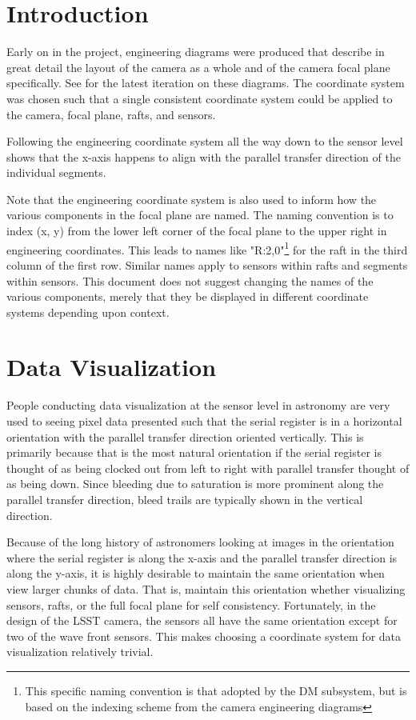 \section{Introduction} \label{sec:intro}
Early on in the project, engineering diagrams were produced that describe in great detail the layout of the camera as a whole and of the camera focal plane specifically. See  for the latest iteration on these diagrams. The coordinate system was chosen such that a single consistent coordinate system could be applied to the camera, focal plane, rafts, and sensors.

Following the engineering coordinate system all the way down to the sensor level shows that the x-axis happens to align with the parallel transfer direction of the individual segments.

Note that the engineering coordinate system is also used to inform how the various components in the focal plane are named. The naming convention is to index (x, y) from the lower left corner of the focal plane to the upper right in engineering coordinates. This leads to names like "R:2,0"\footnote{This specific naming convention is that adopted by the DM subsystem, but is based on the indexing scheme from the camera engineering diagrams} for the raft in the third column of the first row. Similar names apply to sensors within rafts and segments within sensors. This document does not suggest changing the names of the various components, merely that they be displayed in different coordinate systems depending upon context.

\section{Data Visualization}
People conducting data visualization at the sensor level in astronomy are very used to seeing pixel data presented such that the serial register is in a horizontal orientation with the parallel transfer direction oriented vertically. This is primarily because that is the most natural orientation if the serial register is thought of as being clocked out from left to right with parallel transfer thought of as being down. Since bleeding due to saturation is more prominent along the parallel transfer direction, bleed trails are typically shown in the vertical direction.

Because of the long history of astronomers looking at images in the orientation where the serial register is along the x-axis and the parallel transfer direction is along the y-axis, it is highly desirable to maintain the same orientation when view larger chunks of data. That is, maintain this orientation whether visualizing sensors, rafts, or the full focal plane for self consistency. Fortunately, in the design of the LSST camera, the sensors all have the same orientation except for two of the wave front sensors. This makes choosing a coordinate system for data visualization relatively trivial.

